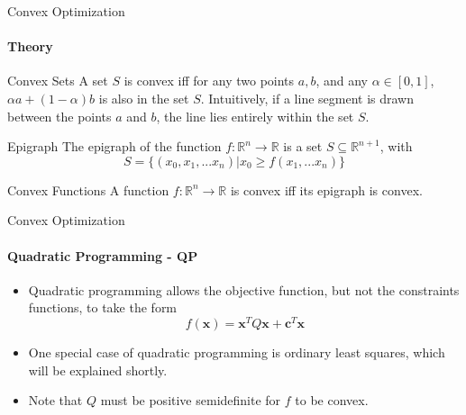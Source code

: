 \documentclass{beamer}
\renewcommand{\vec}{\mathbf}
\begin{document}
	\begin{frame}{Convex Optimization}
		\framesubtitle{Theory}
		\begin{block}{Convex Sets}
			A set $S$ is convex iff for any two points $a, b$, and any $\alpha\in[0,1]$, $\alpha a + (1-\alpha)b$ is also in the set $S$. Intuitively, if a line segment is drawn between the points $a$ and $b$, the line lies entirely within the set $S$.
		\end{block}
		\begin{block}{Epigraph}
			The epigraph of the function $f: \mathbb{R}^n\to\mathbb{R}$ is a set $S\subseteq\mathbb{R}^{n+1}$, with \[
				S = \{(x_0,x_1,...x_n) | x_0 \geq f(x_1,...x_n)\}
			\]
		\end{block}
		\begin{block}{Convex Functions}
			A function $f: \mathbb{R}^n\to\mathbb{R}$ is convex iff its epigraph is convex.
		\end{block}
	\end{frame}
%
%	
	\begin{frame}{Convex Optimization}
		\framesubtitle{Quadratic Programming - QP}
		\begin{itemize}
			\item Quadratic programming allows the objective function, but not the constraints functions, to take the form
			\[f(\vec{x}) = \vec{x}^TQ\vec{x} + \vec{c}^T\vec{x}\]
			\item One special case of quadratic programming is ordinary least squares, which will be explained shortly.
			\item Note that $Q$ must be positive semidefinite for $f$ to be convex.
		\end{itemize}
	\end{frame}
\end{document}

